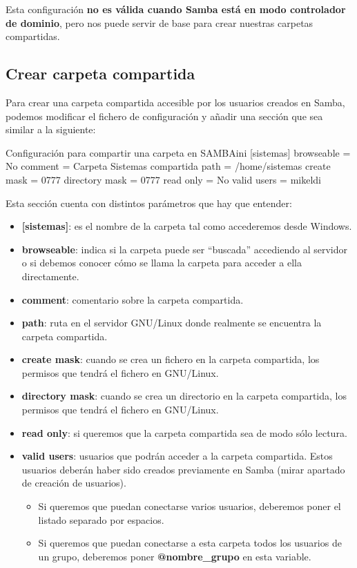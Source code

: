 \documentclass{../../../yukibook.cls/yukibook}
\begin{document}

Esta configuración \textbf{no es válida cuando Samba está en modo controlador de dominio}, pero nos puede servir de base para crear nuestras carpetas compartidas.

\subsection{Crear carpeta compartida}
Para crear una carpeta compartida accesible por los usuarios creados en Samba, podemos modificar el fichero de configuración y añadir una sección que sea similar a la siguiente:

\begin{mycode}{Configuración para compartir una carpeta en SAMBA}{ini}{}
[sistemas]
    browseable = No
    comment = Carpeta Sistemas compartida
    path = /home/sistemas
    create mask = 0777
    directory mask = 0777
    read only = No
    valid users = mikeldi
\end{mycode}

Esta sección cuenta con distintos parámetros que hay que entender:
\begin{itemize}
    \item \textbf{[sistemas]}: es el nombre de la carpeta tal como accederemos desde Windows.
    \item \textbf{browseable}: indica si la carpeta puede ser “buscada” accediendo al servidor o si debemos conocer cómo se llama la carpeta para acceder a ella directamente.
    \item \textbf{comment}: comentario sobre la carpeta compartida.
    \item \textbf{path}: ruta en el servidor GNU/Linux donde realmente se encuentra la carpeta compartida.
    \item \textbf{create mask}: cuando se crea un fichero en la carpeta compartida, los permisos que tendrá el fichero en GNU/Linux.
    \item \textbf{directory mask}: cuando se crea un directorio en la carpeta compartida, los permisos que tendrá el fichero  en GNU/Linux.
    \item \textbf{read only}: si queremos que la carpeta compartida sea de modo sólo lectura.
    \item \textbf{valid users}: usuarios que podrán acceder a la carpeta compartida. Estos usuarios deberán haber sido creados previamente en Samba (mirar apartado de creación de usuarios).
    \begin{itemize}
        \item Si queremos que puedan conectarse varios usuarios, deberemos poner el listado separado por espacios.
        \item Si queremos que puedan conectarse a esta carpeta todos los usuarios de un grupo, deberemos poner \textbf{@nombre\_grupo} en esta variable.
    \end{itemize}
\end{itemize}
\end{document}
